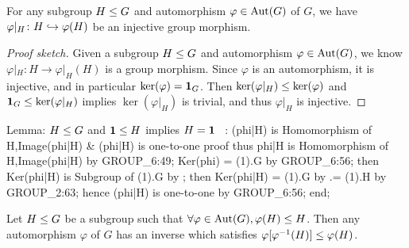 \begin{lemma}\label{lemma:characteristic:automorphism:restrict-automorphism-gives-monomorphism}
For any subgroup $H\leq G$ and automorphism $\varphi\in\operatorname{Aut}(G)$ of
$G$, we have $\varphi|_{H}\colon H\hookrightarrow\varphi(H)$ be an injective group morphism.
\end{lemma}

\begin{proof}[Proof sketch]
Given a subgroup $H\leq G$ and automorphism $\varphi\in\operatorname{Aut}(G)$, we
know $\varphi|_{H}\colon H\to \varphi|_{H}(H)$ is a group morphism.
Since $\varphi$ is an automorphism, it is injective, and in particular
$\ker(\varphi)=\mathbf{1}_{G}$. Then
$\ker(\varphi|_{H})\leq\ker(\varphi)$ and
$\mathbf{1}_{G}\leq\ker(\varphi|_{H})$ implies
$\ker(\varphi|_H)$ is trivial, and thus $\varphi|_{H}$ is injective.
\end{proof}

\nwenddocs{}\endmoddef\nwstartdeflinemarkup{}\nwenddeflinemarkup
\LA{}Lemma: $H\leq G$ and $\mathbf{1}\leq H$ implies $H=\mathbf{1}$~{\nwtagstyle{}}\RA{}
:
(phi|H) is Homomorphism of H,Image(phi|H) & (phi|H) is one-to-one
proof
  thus phi|H is Homomorphism of H,Image(phi|H) by GROUP_6:49;
  Ker(phi) = (1).G by GROUP_6:56;
  then Ker(phi|H) is Subgroup of (1).G by ;
  then Ker(phi|H) = (1).G by 
                 .= (1).H by GROUP_2:63;
  hence (phi|H) is one-to-one by GROUP_6:56;
end;
\eatline
{}\nwendcode{}\nwdocspar
\begin{theorem}\label{thm:characteristic:automorphism:f-fInv-H-is-subgroup-of-H}
Let $H\leq G$ be a subgroup such that
$\forall\varphi\in\operatorname{Aut}(G),\varphi(H)\leq H$.
Then any automorphism $\varphi$ of $G$ has an inverse which satisfies
$\varphi[\varphi^{-1}(H)]\leq\varphi(H)$.
\end{theorem}

